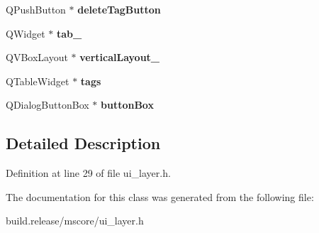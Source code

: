 \begin{DoxyCompactItemize}
Q\+Push\+Button $\ast$ {\bfseries delete\+Tag\+Button}
\item 
\mbox{\label{class_ui___layer_manager_a5a7147ed323f953fb50420431e6959eb}} 
Q\+Widget $\ast$ {\bfseries tab\+\_}
\item 
\mbox{\label{class_ui___layer_manager_aa860160a5d3db5be8816594db864a09f}} 
Q\+V\+Box\+Layout $\ast$ {\bfseries vertical\+Layout\+\_}
\item 
\mbox{\label{class_ui___layer_manager_a155f4884a8c87c887c6a883bc21cd0b6}} 
Q\+Table\+Widget $\ast$ {\bfseries tags}
\item 
\mbox{\label{class_ui___layer_manager_a508c560afc21dda10171fab318a1f5f4}} 
Q\+Dialog\+Button\+Box $\ast$ {\bfseries button\+Box}
\end{DoxyCompactItemize}


\subsection{Detailed Description}


Definition at line 29 of file ui\+\_\+layer.\+h.



The documentation for this class was generated from the following file\+:\begin{DoxyCompactItemize}
\item 
build.\+release/mscore/ui\+\_\+layer.\+h\end{DoxyCompactItemize}
